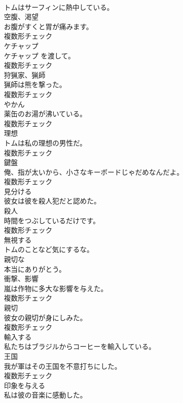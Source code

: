 \documentclass[8pt]{extreport}
\begin{document}
\begin{CJK}{UTF8}{min}
\\	トムはサーフィンに熱中している。	
\\	[名詞]	空腹、渇望	
\\	お腹がすくと胃が痛みます。	
\\	複数形チェック
\\	[名詞]	ケチャップ	
\\	ケチャップ を渡して。	
\\	複数形チェック
\\	[名詞]	狩猟家、猟師	
\\	猟師は熊を撃った。	
\\	複数形チェック
\\	[名詞]	やかん	
\\	薬缶のお湯が沸いている。	
\\	複数形チェック
\\	[名詞]	理想	
\\	トムは私の理想の男性だ。	
\\	複数形チェック
\\	[名詞]	鍵盤	
\\	俺、指が太いから、小さなキーボードじゃだめなんだよ。	
\\	複数形チェック
\\	[動詞]	見分ける	
\\	彼女は彼を殺人犯だと認めた。	
\\	[名詞]	殺人	
\\	時間をつぶしているだけです。	
\\	複数形チェック
\\	[動詞]	無視する	
\\	トムのことなど気にするな。	
\\	[形容詞]	親切な	
\\	本当にありがとう。	
\\	[名詞]	衝撃、影響	
\\	嵐は作物に多大な影響を与えた。	
\\	複数形チェック
\\	[名詞]	親切	
\\	彼女の親切が身にしみた。	
\\	複数形チェック
\\	[動詞]	輸入する	
\\	私たちはブラジルからコーヒーを輸入している。	
\\	[名詞]	王国	
\\	我が軍はその王国を不意打ちにした。	
\\	複数形チェック
\\	[動詞]	印象を与える	
\\	私は彼の音楽に感動した。	

\end{CJK}
\end{document}
